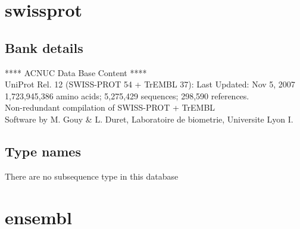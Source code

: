 \documentclass{article}
\begin{document}
\begin{Schunk}
\section{ swissprot }
\subsection{Bank details}
               ****     ACNUC Data Base Content      ****                       \\
    UniProt Rel. 12 (SWISS-PROT 54 + TrEMBL 37): Last Updated: Nov  5, 2007\\
          1,723,945,386 amino acids; 5,275,429 sequences; 298,590 references.\\
          Non-redundant compilation of SWISS-PROT + TrEMBL\\
Software by M. Gouy \& L. Duret, Laboratoire de biometrie, Universite Lyon I.

\subsection{Type names}
There are no subsequence type in this database
\section{ ensembl }

\end{Schunk}
\end{document}
